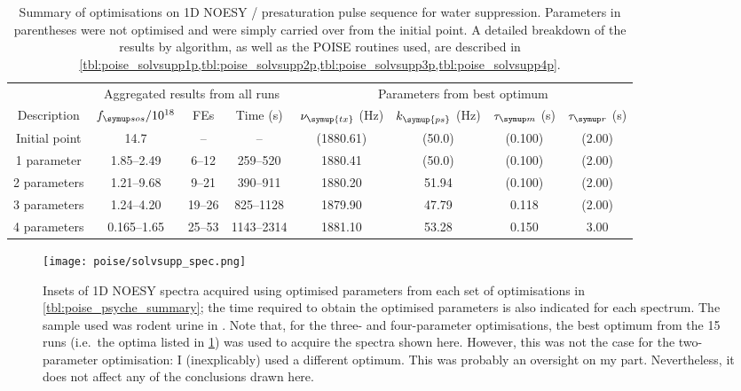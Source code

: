 \begin{table}
    \centering
    \begin{tabular}{cccccccc}
        \toprule
         & \multicolumn{3}{c}{Aggregated results from all runs} & \multicolumn{4}{c}{Parameters from best optimum} \\
        Description & $\fsos / 10^{18}$ & FEs & Time (\unit{\s}) & $\nu_{\symup{tx}}$ (\unit{\Hz}) & $k_{\symup{ps}}$ (\unit{\Hz}) & $\taum$ (\unit{\s}) & $\taur$ (\unit{\s}) \\
        \hline
        Initial point & 14.7         & --     & --         & (1880.61) & (50.0) & (0.100) & (2.00) \\
        1 parameter   & 1.85--2.49   & 6--12  & 259--520   & 1880.41   & (50.0) & (0.100) & (2.00) \\
        2 parameters  & 1.21--9.68   & 9--21  & 390--911   & 1880.20   & 51.94  & (0.100) & (2.00) \\
        3 parameters  & 1.24--4.20   & 19--26 & 825--1128  & 1879.90   & 47.79  & 0.118   & (2.00) \\
        4 parameters  & 0.165--1.65  & 25--53 & 1143--2314 & 1881.10   & 53.28  & 0.150   & 3.00 \\
        \hline
    \end{tabular}
    \caption[Overview of all water suppression optimisations]{
        Summary of optimisations on 1D NOESY / presaturation pulse sequence for water suppression.
        Parameters in parentheses were not optimised and were simply carried over from the initial point.
        A detailed breakdown of the results by algorithm, as well as the POISE routines used, are described in \cref{tbl:poise_solvsupp1p,tbl:poise_solvsupp2p,tbl:poise_solvsupp3p,tbl:poise_solvsupp4p}.
    }
    \label{tbl:poise_solvsupp_summary}
\end{table}

\begin{figure}[!ht]
    \centering
    \texttt{[image: poise/solvsupp\_spec.png]}
    \caption[1D NOESY spectra of rodent urine sample before and after optimisation]{
        Insets of 1D NOESY spectra acquired using optimised parameters from each set of optimisations in \cref{tbl:poise_psyche_summary}; the time required to obtain the optimised parameters is also indicated for each spectrum.
        The sample used was rodent urine in .
        Note that, for the three- and four-parameter optimisations, the best optimum from the 15 runs (i.e.\ the optima listed in \cref{tbl:poise_solvsupp_summary}) was used to acquire the spectra shown here.
        However, this was not the case for the two-parameter optimisation: I (inexplicably) used a different optimum.
        This was probably an oversight on my part.
        Nevertheless, it does not affect any of the conclusions drawn here.
    }
    \label{fig:poise_solvsupp_spec}
\end{figure}

